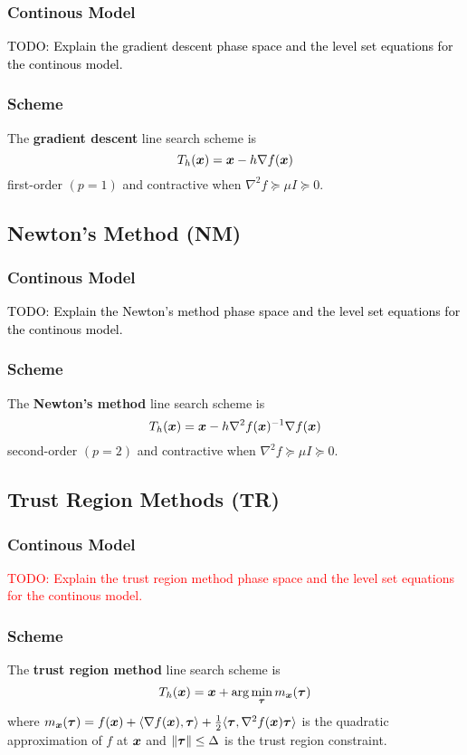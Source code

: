 \documentclass[11pt]{article}
\begin{document}
    \subsubsection*{Continous Model}
        \textcolor{Black}{
            TODO: Explain the gradient descent phase space and the level
            set equations for the continous model.
        }
    \subsubsection*{Scheme}
        The \textbf{gradient descent} line search scheme is
        $$
            T_h(\bm{x}) = \bm{x} - h \nabla f(\bm{x})
        $$
        first-order $(p = 1)$ and contractive when $\nabla^2 f \succeq \mu I \succeq 0$.

    \medskip


    \subsection{Newton's Method (NM)}
    \subsubsection*{Continous Model}
        \textcolor{Black}{
            TODO: Explain the Newton's method phase space and the level
            set equations for the continous model.
        }

    \subsubsection*{Scheme}
        The \textbf{Newton's method} line search scheme is
        $$
            T_h(\bm{x}) = \bm{x} - h \nabla^2 f(\bm{x})^{-1} \nabla f(\bm{x})
        $$
        second-order $(p = 2)$ and contractive when $\nabla^2 f \succeq \mu I \succeq 0$.
    \medskip

    \subsection{Trust Region Methods (TR)}
    \subsubsection*{Continous Model}
        \textcolor{Red}{
            TODO: Explain the trust region method phase space and the level
            set equations for the continous model.
        }
    \subsubsection*{Scheme}
        The \textbf{trust region method} line search scheme is
        $$
            T_h(\bm{x}) = \bm{x} + \arg \min_{\bm{\tau}} m_{\bm{x}}(\bm{\tau})
        $$ 
        where $m_{\bm{x}}(\bm{\tau}) = f(\bm{x}) + \langle \nabla f(\bm{x}), \bm{\tau} \rangle +
        \frac{1}{2} \langle \bm{\tau}, \nabla^2 f(\bm{x}) \bm{\tau} \rangle$ is the 
        quadratic approximation of $f$ at $\bm{x}$ and $\|\bm{\tau}\| \leq \Delta$
        is the trust region constraint.
\end{document}
